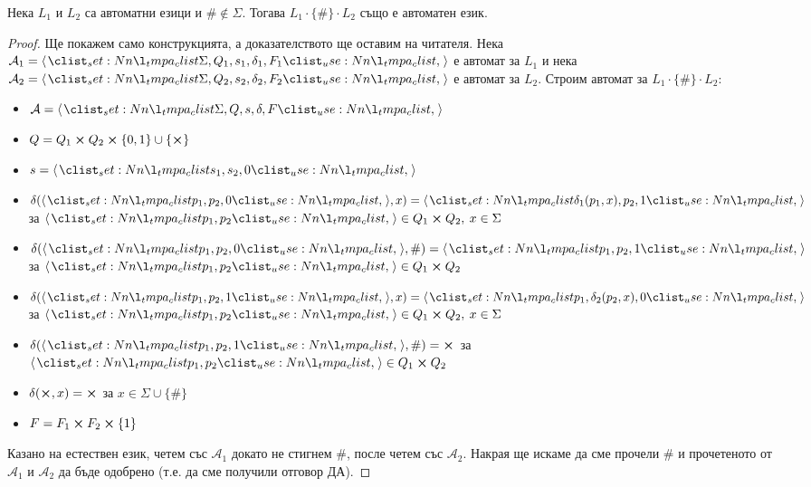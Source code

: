 \pagebreak

\begin{claim}
    Нека $L_1$ и $L_2$ са автоматни езици и $\# \notin \Sigma$.
    Тогава $L_1 \cdot \{ \# \} \cdot L_2$ също е автоматен език.
\end{claim}

\begin{proof}
    Ще покажем само конструкцията, а доказателството ще оставим на читателя.
    Нека $\mathcal{A}_1 = \opair{\Sigma, Q_1, s_1, \delta_1, F_1}$ е автомат за $L_1$ и нека $\mathcal{A}_2 = \opair{\Sigma, Q_2, s_2, \delta_2, F_2}$ е автомат за $L_2$.
    Строим автомат за $L_1 \cdot \{ \# \} \cdot L_2$:
    \begin{itemize}
        \item $\mathcal{A} = \opair{\Sigma, Q, s, \delta, F}$
        \item $Q = Q_1 \cross Q_2 \cross \{ 0, 1 \} \cup \{ \cross \}$
        \item $s = \opair{s_1, s_2, 0}$
        \item $\delta(\opair{p_1, p_2, 0}, x) = \opair{\delta_1(p_1, x), p_2, 1}$ за $\opair{p_1, p_2} \in Q_1 \cross Q_2, \: x \in \Sigma$
        \item $\delta(\opair{p_1, p_2, 0}, \#) = \opair{p_1, p_2, 1}$ за $\opair{p_1, p_2} \in Q_1 \cross Q_2$
        \item $\delta(\opair{p_1, p_2, 1}, x) = \opair{p_1, \delta_2(p_2, x), 0}$ за $\opair{p_1, p_2} \in Q_1 \cross Q_2, \: x \in \Sigma$
        \item $\delta(\opair{p_1, p_2, 1}, \#) = \cross$ за $\opair{p_1, p_2} \in Q_1 \cross Q_2$
        \item $\delta(\cross, x) = \cross$ за $x \in \Sigma \cup \{ \# \}$
        \item $F = F_1 \cross F_2 \cross \{ 1 \}$
    \end{itemize}

    Казано на естествен език, четем със $\mathcal{A}_1$ докато не стигнем $\#$, после четем със $\mathcal{A}_2$.
    Накрая ще искаме да сме прочели $\#$ и прочетеното от $\mathcal{A}_1$ и $\mathcal{A}_2$ да бъде одобрено (т.е. да сме получили отговор ДА).
\end{proof}